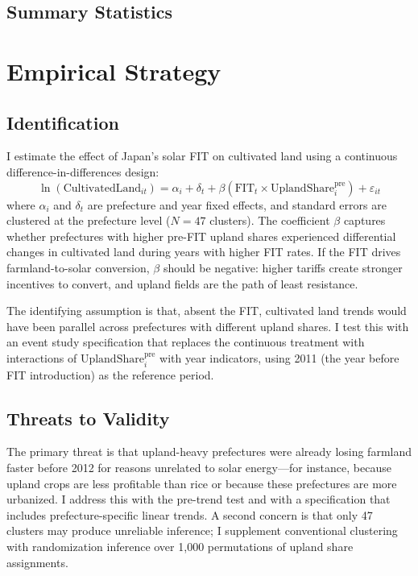 \documentclass[12pt]{article}
\begin{document}
\subsection{Summary Statistics}




\section{Empirical Strategy}

\subsection{Identification}

I estimate the effect of Japan's solar FIT on cultivated land using a continuous difference-in-differences design:
\begin{equation}
\ln(\text{CultivatedLand}_{it}) = \alpha_i + \delta_t + \beta \left(\text{FIT}_t \times \text{UplandShare}_i^{\text{pre}}\right) + \varepsilon_{it}
\label{eq:main}
\end{equation}
where $\alpha_i$ and $\delta_t$ are prefecture and year fixed effects, and standard errors are clustered at the prefecture level ($N = 47$ clusters). The coefficient $\beta$ captures whether prefectures with higher pre-FIT upland shares experienced differential changes in cultivated land during years with higher FIT rates. If the FIT drives farmland-to-solar conversion, $\beta$ should be negative: higher tariffs create stronger incentives to convert, and upland fields are the path of least resistance.

The identifying assumption is that, absent the FIT, cultivated land trends would have been parallel across prefectures with different upland shares. I test this with an event study specification that replaces the continuous treatment with interactions of $\text{UplandShare}_i^{\text{pre}}$ with year indicators, using 2011 (the year before FIT introduction) as the reference period.

\subsection{Threats to Validity}

The primary threat is that upland-heavy prefectures were already losing farmland faster before 2012 for reasons unrelated to solar energy---for instance, because upland crops are less profitable than rice or because these prefectures are more urbanized. I address this with the pre-trend test and with a specification that includes prefecture-specific linear trends. A second concern is that only 47 clusters may produce unreliable inference; I supplement conventional clustering with randomization inference over 1,000 permutations of upland share assignments.
\end{document}
